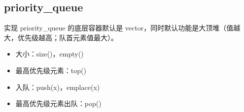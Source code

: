 \documentclass[letterpaper,10pt,english]{sphinxmanual}
\begin{document}
\subsection{priority\_queue}
\label{\detokenize{cpp/19_stl:priority-queue}}
%
\begin{sphinxVerbatim}[commandchars=\\\{\}]
\end{sphinxVerbatim}

实现 priority\_queue 的底层容器默认是 vector，同时默认功能是大顶堆（值越大，优先级越高；队首元素值最大）。

%
\begin{sphinxVerbatim}[commandchars=\\\{\}]
      
       
\end{sphinxVerbatim}
\begin{itemize}
\item {} 
大小：size()，empty()

\item {} 
最高优先级元素：top()

\item {} 
入队：push(x)，emplace(x)

\item {} 
最高优先级元素出队：pop()

\end{itemize}
\end{document}

